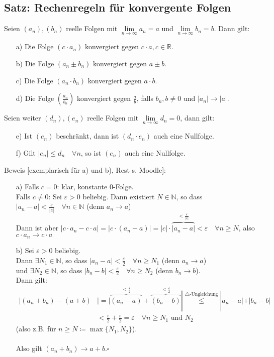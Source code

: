 \documentclass[12pt, titlepage]{article}
\newcommand{\R}{\mathds{R}}
\newcommand{\N}{\mathds{N}}
\newcommand{\infn}{n\rightarrow\infty}
\renewcommand{\*}{\cdot}
\renewcommand{\epsilon}{\varepsilon}
\begin{document}
	\subsection{Satz: Rechenregeln für konvergente Folgen}
	Seien $(a_n), (b_n)$ reelle Folgen mit $\lim\limits_{\infn}a_n=a$ und $\lim\limits_{\infn}b_n=b$. Dann gilt:
	\begin{itemize}
		\item[a)] Die Folge $(c\*a_n)$ konvergiert gegen $c\*a, c\in\R$.
		\item[b)] Die Folge $(a_n\pm b_n)$ konvergiert gegen $a\pm b$.
		\item[c)] Die Folge $(a_n\*b_n)$ konvergiert gegen $a\*b$.
		\item[d)] Die Folge $(\frac{a_n}{b_n})$ konvergiert gegen $\frac{a}{b}$, falls $b_n, b\neq0$ und $|a_n|\rightarrow|a|$.
	\end{itemize}
	Seien weiter $(d_n), (e_n)$ reelle Folgen mit $\lim\limits_{\infn}d_n=0$, dann gilt:
	\begin{itemize}
		\item[e)] Ist $(e_n)$ beschränkt, dann ist $(d_n\*e_n)$ auch eine Nullfolge.
		\item[f)] Gilt $|e_n|\leq d_n\quad\forall n$, so ist $(e_n)$ auch eine Nullfolge.
	\end{itemize}
	Beweis [exemplarisch für a) und b), Rest s. Moodle]:\\
	\begin{itemize}
		\item[a)] Falls $c=0$: klar, konstante 0-Folge.\\
		Falls $c\neq 0$: Sei $\epsilon>0$ beliebig. Dann existiert $N\in\N$, so dass $|a_n-a|<\frac{\epsilon}{|c|}\quad\forall n\in\N$ (denn $a_n\rightarrow a$)\\
		Dann ist aber $|c\*a_n-c\*a|=|c\*(a_n-a)|=|c|\*\overbrace{|a_n-a|}^{<\frac{\epsilon}{|c|}}<\epsilon\quad\forall n\geq N$, also $c\*a_n\rightarrow c\*a$
		\item[b)] Sei $\epsilon>0$ beliebig.\\
		Dann $\exists N_1\in\N$, so dass $|a_n-a|<\frac{\epsilon}{2}\quad\forall n\geq N_1$ (denn $a_n\rightarrow a$)\\
		und $\exists N_2\in\N$, so dass $|b_n-b|<\frac{\epsilon}{2}\quad\forall n\geq N_2$ (denn $b_n\rightarrow b$).\\
		Dann gilt:
		\begin{align*}
			|(a_n+b_n)-(a+b)&|=|\overbrace{(a_n-a)}^{<\frac{\epsilon}{2}}+\overbrace{(b_n-b)}^{<\frac{\epsilon}{2}}|\overset{\triangle\textrm{-Ungleichung}}{\leq}|a_n-a|+|b_n-b|\\
			&<\frac{\epsilon}{2}+\frac{\epsilon}{2}=\epsilon\quad\forall n\geq N_1\textrm{ und }N_2
		\end{align*}
		(also z.B. für $n\geq N\coloneqq\max\{N_1,N_2\}$).\\
		\\
		Also gilt $(a_n+b_n)\rightarrow a+b$.\hfill$\square$
	\end{itemize}
\end{document}
